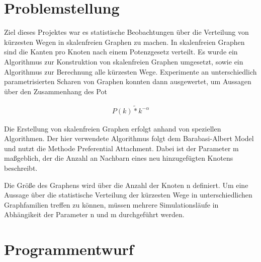 \documentclass[10pt]{article}
\begin{document}
\lstset{
	language=C,
	basicstyle=\footnotesize,
	frame=tb,
	xleftmargin=.2\textwidth,
	xrightmargin=.2\textwidth
}
\onehalfspacing

\tableofcontents
\newpage
\section{Problemstellung}

Ziel dieses Projektes war es statistische Beobachtungen über die Verteilung von kürzesten Wegen in skalenfreien Graphen zu machen. In skalenfreien Graphen sind die Kanten pro Knoten nach einem Potenzgesetz verteilt. Es wurde ein Algorithmus zur Konstruktion von skalenfreien Graphen umgesetzt, sowie ein Algorithmus zur Berechnung alle kürzesten Wege. Experimente an unterschiedlich parametrisierten Scharen von Graphen konnten dann ausgewertet, um Aussagen über den Zusammenhang des Pot 

\begin{align*}
P(k) \tilde{*} k^{-\alpha}
\end{align*}

Die Erstellung von skalenfreien Graphen erfolgt anhand von speziellen Algorithmen. Der hier verwendete Algorithmus folgt dem Barabasi-Albert Model und nutzt die Methode Preferential Attachment. Dabei ist der Parameter m maßgeblich, der die Anzahl an Nachbarn eines neu hinzugefügten Knotens beschreibt. 

Die Größe des Graphens wird über die Anzahl der Knoten n definiert. Um eine Aussage über die statistische Verteilung der kürzesten Wege in unterschiedlichen Graphfamilien treffen zu können, müssen mehrere Simulationsläufe in Abhängikeit der Parameter n und m durchgeführt werden.

\section{Programmentwurf}
\end{document}
